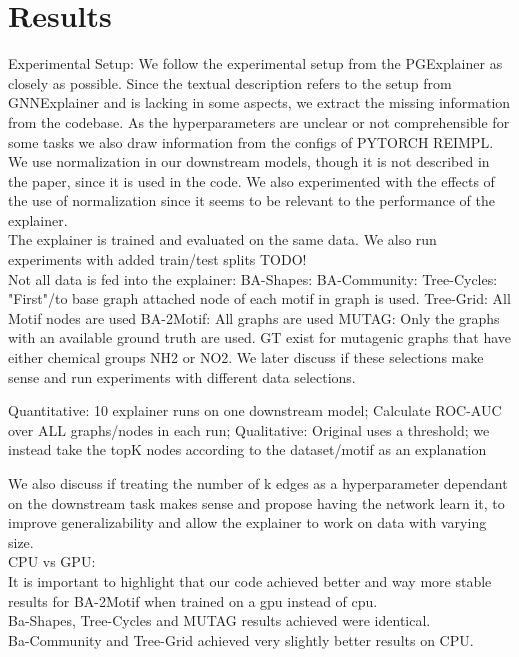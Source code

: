 \chapter{Results}
\label{ch:Results}

Experimental Setup:
We follow the experimental setup from the PGExplainer as closely as possible. Since the textual description refers to the setup from GNNExplainer and is lacking in some aspects, we extract the missing information from the codebase. As the hyperparameters are unclear or not comprehensible for some tasks we also draw information from the configs of PYTORCH REIMPL. \\

We use normalization in our downstream models, though it is not described in the paper, since it is used in the code. We also experimented with the effects of the use of normalization since it seems to be relevant to the performance of the explainer. \\
The explainer is trained and evaluated on the same data. We also run experiments with added train/test splits TODO! \\
Not all data is fed into the explainer:
BA-Shapes: 
BA-Community:
Tree-Cycles: "First"/to base graph attached node of each motif in graph is used.
Tree-Grid: All Motif nodes are used
BA-2Motif: All graphs are used
MUTAG: Only the graphs with an available ground truth are used. GT exist for mutagenic graphs that have either chemical groups NH2 or NO2.
We later discuss if these selections make sense and run experiments with different data selections.

Quantitative: 10 explainer runs on one downstream model; Calculate ROC-AUC over ALL graphs/nodes in each run;
Qualitative: Original uses a threshold; we instead take the topK nodes according to the dataset/motif as an explanation

We also discuss if treating the number of k edges as a hyperparameter dependant on the downstream task makes sense and propose having the network learn it, to improve generalizability and allow the explainer to work on data with varying size. \\

CPU vs GPU: \\
It is important to highlight that our code achieved better and way more stable results for BA-2Motif when trained on a gpu instead of cpu. \\
Ba-Shapes, Tree-Cycles and MUTAG results achieved were identical. \\
Ba-Community and Tree-Grid achieved very slightly better results on CPU. \\

